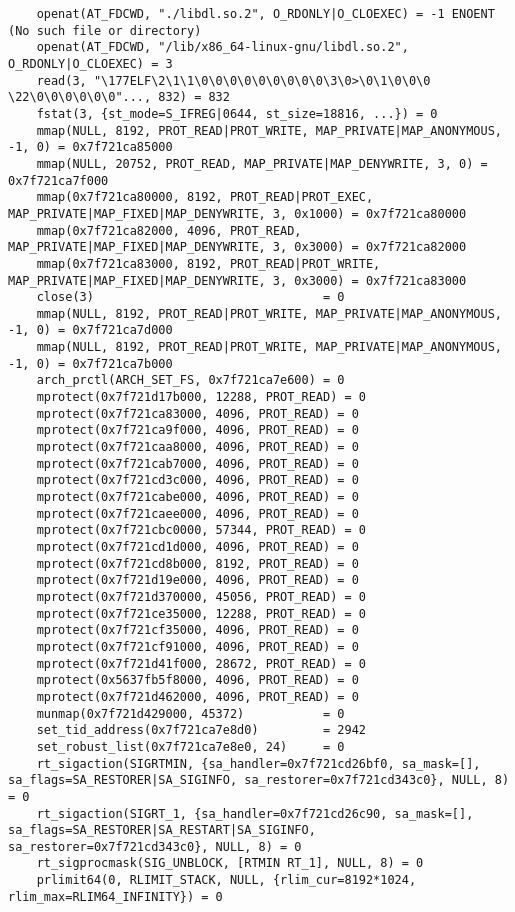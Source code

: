 \documentclass[pdf, unicode, 12pt, a4paper,oneside,fleqn]{article}
\begin{document}
{\begin{verbatim}
    openat(AT_FDCWD, "./libdl.so.2", O_RDONLY|O_CLOEXEC) = -1 ENOENT (No such file or directory)
    openat(AT_FDCWD, "/lib/x86_64-linux-gnu/libdl.so.2", O_RDONLY|O_CLOEXEC) = 3
    read(3, "\177ELF\2\1\1\0\0\0\0\0\0\0\0\0\3\0>\0\1\0\0\0 \22\0\0\0\0\0\0"..., 832) = 832
    fstat(3, {st_mode=S_IFREG|0644, st_size=18816, ...}) = 0
    mmap(NULL, 8192, PROT_READ|PROT_WRITE, MAP_PRIVATE|MAP_ANONYMOUS, -1, 0) = 0x7f721ca85000
    mmap(NULL, 20752, PROT_READ, MAP_PRIVATE|MAP_DENYWRITE, 3, 0) = 0x7f721ca7f000
    mmap(0x7f721ca80000, 8192, PROT_READ|PROT_EXEC, MAP_PRIVATE|MAP_FIXED|MAP_DENYWRITE, 3, 0x1000) = 0x7f721ca80000
    mmap(0x7f721ca82000, 4096, PROT_READ, MAP_PRIVATE|MAP_FIXED|MAP_DENYWRITE, 3, 0x3000) = 0x7f721ca82000
    mmap(0x7f721ca83000, 8192, PROT_READ|PROT_WRITE, MAP_PRIVATE|MAP_FIXED|MAP_DENYWRITE, 3, 0x3000) = 0x7f721ca83000
    close(3)                                = 0
    mmap(NULL, 8192, PROT_READ|PROT_WRITE, MAP_PRIVATE|MAP_ANONYMOUS, -1, 0) = 0x7f721ca7d000
    mmap(NULL, 8192, PROT_READ|PROT_WRITE, MAP_PRIVATE|MAP_ANONYMOUS, -1, 0) = 0x7f721ca7b000
    arch_prctl(ARCH_SET_FS, 0x7f721ca7e600) = 0
    mprotect(0x7f721d17b000, 12288, PROT_READ) = 0
    mprotect(0x7f721ca83000, 4096, PROT_READ) = 0
    mprotect(0x7f721ca9f000, 4096, PROT_READ) = 0
    mprotect(0x7f721caa8000, 4096, PROT_READ) = 0
    mprotect(0x7f721cab7000, 4096, PROT_READ) = 0
    mprotect(0x7f721cd3c000, 4096, PROT_READ) = 0
    mprotect(0x7f721cabe000, 4096, PROT_READ) = 0
    mprotect(0x7f721caee000, 4096, PROT_READ) = 0
    mprotect(0x7f721cbc0000, 57344, PROT_READ) = 0
    mprotect(0x7f721cd1d000, 4096, PROT_READ) = 0
    mprotect(0x7f721cd8b000, 8192, PROT_READ) = 0
    mprotect(0x7f721d19e000, 4096, PROT_READ) = 0
    mprotect(0x7f721d370000, 45056, PROT_READ) = 0
    mprotect(0x7f721ce35000, 12288, PROT_READ) = 0
    mprotect(0x7f721cf35000, 4096, PROT_READ) = 0
    mprotect(0x7f721cf91000, 4096, PROT_READ) = 0
    mprotect(0x7f721d41f000, 28672, PROT_READ) = 0
    mprotect(0x5637fb5f8000, 4096, PROT_READ) = 0
    mprotect(0x7f721d462000, 4096, PROT_READ) = 0
    munmap(0x7f721d429000, 45372)           = 0
    set_tid_address(0x7f721ca7e8d0)         = 2942
    set_robust_list(0x7f721ca7e8e0, 24)     = 0
    rt_sigaction(SIGRTMIN, {sa_handler=0x7f721cd26bf0, sa_mask=[], sa_flags=SA_RESTORER|SA_SIGINFO, sa_restorer=0x7f721cd343c0}, NULL, 8) = 0
    rt_sigaction(SIGRT_1, {sa_handler=0x7f721cd26c90, sa_mask=[], sa_flags=SA_RESTORER|SA_RESTART|SA_SIGINFO, sa_restorer=0x7f721cd343c0}, NULL, 8) = 0
    rt_sigprocmask(SIG_UNBLOCK, [RTMIN RT_1], NULL, 8) = 0
    prlimit64(0, RLIMIT_STACK, NULL, {rlim_cur=8192*1024, rlim_max=RLIM64_INFINITY}) = 0

\end{verbatim}}
\end{document}
